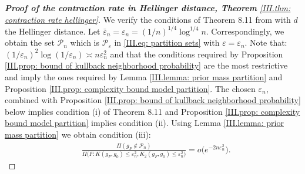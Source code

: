\begin{proof}[\hypertarget{III.proof contraction hellinger}{\textbf{Proof of the contraction rate in Hellinger distance, Theorem} \ref{III.thm: contraction rate hellinger}}] We verify the conditions of Theorem 8.11 from \cite{4} with $d$ the Hellinger distance. Let $\bar{\varepsilon}_n = \varepsilon_n = (1 / n)^{1 / 4} \log^{1/4}n$. Correspondingly, we obtain the set $\mathcal{P}_n$ which is $\mathcal{P}_{\varepsilon}$ in \eqref{III.eq: partition sets} with $\varepsilon = \varepsilon_n$. Note that: $(1/ \varepsilon_n)^2 \log (1/ \varepsilon_n) \asymp n \varepsilon_n^2$ and that the conditions required by Proposition \ref{III.prop: bound of kullback neighborhood probability} are the most restrictive and imply the ones required by Lemma \ref{III.lemma: prior mass partition} and Proposition \ref{III.prop: complexity bound model partition}. The chosen $\varepsilon_n$, combined with Proposition \ref{III.prop: bound of kullback neighborhood probability} below implies condition (i) of Theorem 8.11 and Proposition \ref{III.prop: complexity bound model partition} implies condition (ii). Using Lemma \ref{III.lemma: prior mass partition} we obtain condition (iii):
\begin{align*}
    &\frac{\Pi(g_{\scriptscriptstyle{F}} \notin \mathcal{P}_n)}{\Pi \big(F: K\left(g_{\scriptscriptstyle{F}}, g_0\right) \leq \varepsilon^2_n, K_2\left(g_{\scriptscriptstyle{F}}, g_0\right) \leq \varepsilon^2_n \big)}= o \big(e^{-2n \varepsilon_n^2} \big).
\end{align*}
\end{proof}

